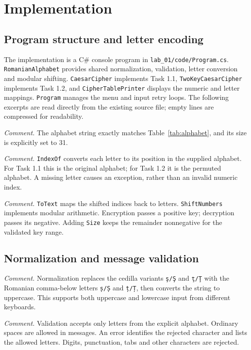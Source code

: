 \documentclass{tum_report}
\newcommand{\codepart}[3]{{\setstretch{1}}}
\begin{document}
\clearpage
\chapter{Implementation}
\section{Program structure and letter encoding}
The implementation is a C\# console program in \texttt{lab\_01/code/Program.cs}.
\texttt{RomanianAlphabet} provides shared normalization, validation, letter
conversion and modular shifting. \texttt{CaesarCipher} implements Task 1.1,
\texttt{TwoKeyCaesarCipher} implements Task 1.2, and
\texttt{CipherTablePrinter} displays the numeric and letter mappings.
\texttt{Program} manages the menu and input retry loops. The following
excerpts are read directly from the existing source file; empty lines are
compressed for readability.

\codepart{10}{11}{4}
\noindent\textit{Comment.} The alphabet string exactly matches Table~\ref{tab:alphabet},
and its size is explicitly set to 31.

\codepart{75}{85}{8}
\noindent\textit{Comment.} \texttt{IndexOf} converts each letter to its position
in the supplied alphabet. For Task 1.1 this is the original alphabet; for
Task 1.2 it is the permuted alphabet. A missing letter causes an exception,
rather than an invalid numeric index.

\codepart{90}{112}{4}
\noindent\textit{Comment.} \texttt{ToText} maps the shifted indices back to
letters. \texttt{ShiftNumbers} implements modular arithmetic. Encryption
passes a positive key; decryption passes its negative. Adding \texttt{Size}
keeps the remainder nonnegative for the validated key range.

\clearpage
\section{Normalization and message validation}
\codepart{13}{22}{4}
\noindent\textit{Comment.} Normalization replaces the cedilla variants
\texttt{ş/Ş} and \texttt{ţ/Ţ} with the Romanian comma-below letters
\texttt{ș/Ș} and \texttt{ț/Ț}, then converts the string to uppercase.
This supports both uppercase and lowercase input from different keyboards.

\codepart{24}{40}{4}
\noindent\textit{Comment.} Validation accepts only letters from the explicit
alphabet. Ordinary spaces are allowed in messages. An error identifies the
rejected character and lists the allowed letters. Digits, punctuation,
tabs and other characters are rejected.
\end{document}
